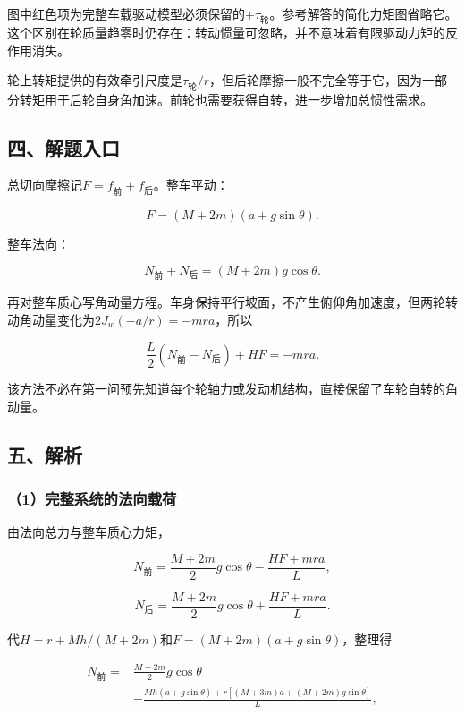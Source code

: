 \documentclass[12pt,a4paper,fontset=fandol]{ctexart}
\begin{document}
图中红色项为完整车载驱动模型必须保留的\(+\tau_{\text{轮}}\)。参考解答的简化力矩图省略它。这个区别在轮质量趋零时仍存在：转动惯量可忽略，并不意味着有限驱动力矩的反作用消失。

轮上转矩提供的有效牵引尺度是\(\tau_{\text{轮}}/r\)，但后轮摩擦一般不完全等于它，因为一部分转矩用于后轮自身角加速。前轮也需要获得自转，进一步增加总惯性需求。

\subsection{四、解题入口}\label{ux56dbux89e3ux9898ux5165ux53e3-6}

总切向摩擦记\(F=f_{\text{前}}+f_{\text{后}}\)。整车平动：

\[
F=(M+2m)(a+g\sin\theta).
\]

整车法向：

\[
N_{\text{前}}+N_{\text{后}}=(M+2m)g\cos\theta.
\]

再对整车质心写角动量方程。车身保持平行坡面，不产生俯仰角加速度，但两轮转动角动量变化为\(2J_w(-a/r)=-mra\)，所以

\[
\frac L2(N_{\text{前}}-N_{\text{后}})+HF=-mra.
\]

该方法不必在第一问预先知道每个轮轴力或发动机结构，直接保留了车轮自转的角动量。

\subsection{五、解析}\label{ux4e94ux89e3ux6790-6}

\subsubsection{（1）完整系统的法向载荷}\label{ux5b8cux6574ux7cfbux7edfux7684ux6cd5ux5411ux8f7dux8377}

由法向总力与整车质心力矩，

\[
N_{\text{前}}=\frac{M+2m}{2}g\cos\theta-\frac{HF+mra}{L},
\]

\[
N_{\text{后}}=\frac{M+2m}{2}g\cos\theta+\frac{HF+mra}{L}.
\]

代\(H=r+Mh/(M+2m)\)和\(F=(M+2m)(a+g\sin\theta)\)，整理得

\[
\boxed{
\begin{aligned}
N_{\text{前}}
={}&\frac{M+2m}{2}g\cos\theta\\
&-\frac{Mh(a+g\sin\theta)
+r[(M+3m)a+(M+2m)g\sin\theta]}L,
\end{aligned}}
\]
\end{document}
